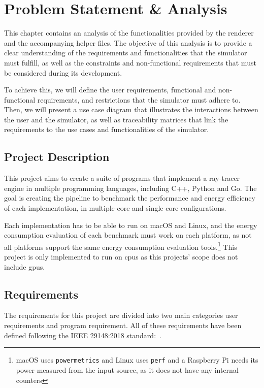 \chapter{Problem Statement \& Analysis}\label{chap:analysis}

This chapter contains an analysis of the functionalities provided by the renderer and the accompanying helper files. The objective of this analysis is to provide a clear understanding of the requirements and functionalities that the simulator must fulfill, as well as the constraints and non-functional requirements that must be considered during its development.

To achieve this, we will define the user requirements, functional and non-functional requirements, and restrictions that the simulator must adhere to. Then, we will present a use case diagram that illustrates the interactions between the user and the simulator, as well as traceability matrices that link the requirements to the use cases and functionalities of the simulator.

\section{Project Description}
This project aims to create a suite of programs that implement a ray-tracer engine in multiple programming languages, including C++, Python and Go. The goal is creating the pipeline to benchmark the performance and energy efficiency of each implementation, in multiple-core and single-core configurations.

Each implementation has to be able to run on macOS and Linux, and the energy consumption evaluation of each benchmark must work on each platform, as not all platforms support the same energy consumption evaluation tools.\footnote{macOS uses \texttt{powermetrics} and Linux uses \texttt{perf} and a Raspberry Pi needs its power measured from the input source, as it does not have any internal counters} This project is only implemented to run on \glspl{cpu} as this projects' scope does not include \glspl{gpu}.


\section{Requirements}


The requirements for this project are divided into two main categories user requirements and program requirement. All of these requirements have been defined following the IEEE 29148:2018 standard:~\autocite{requirements-engineering-iso}. 

